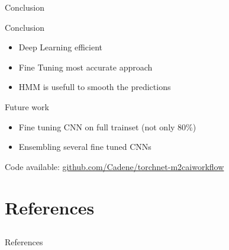 \begin{frame}{Conclusion}

	\begin{block}{Conclusion}
		\begin{itemize}
			\item Deep Learning efficient %
			\item Fine Tuning most accurate approach %
			\item HMM is usefull to smooth the predictions %
		\end{itemize}
	\end{block}
	
	\begin{block}{Future work}
		\begin{itemize}
			\item Fine tuning CNN on full trainset (not only 80\%)
			\item Ensembling several fine tuned CNNs
		\end{itemize}
	\end{block}
	
	Code available: \url{github.com/Cadene/torchnet-m2caiworkflow}
	
\end{frame}

\section{References} \subsection{}\label{references}

\begin{frame}[allowframebreaks]{References}
	
	\printbibliography[heading=none]
	
\end{frame}
